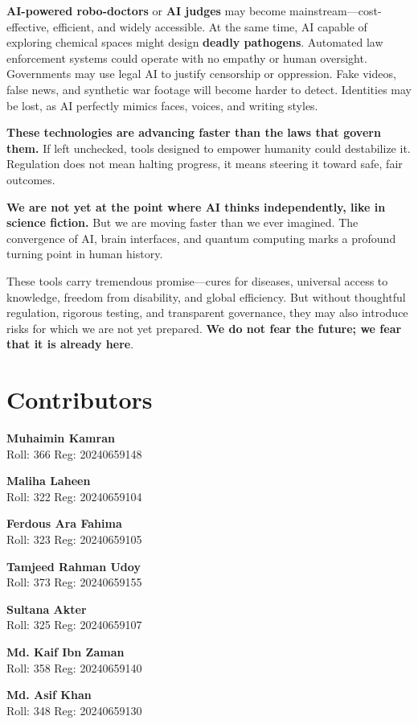 \documentclass[a4paper,10pt,twocolumn]{memoir}
\newcommand{\contributor}[4]{%
  \vspace{0.4em}
  \begin{minipage}{\textwidth}
    \textbf{\normalsize #1}\\
    {\footnotesize Roll: #2 \quad Reg: #3}\\
    {\footnotesize\color{gray}#4}
  \end{minipage}
}
\begin{document}
\textbf{AI-powered robo-doctors} or \textbf{AI judges} may become mainstream—cost-effective, efficient, and widely accessible. At the same time, AI capable of exploring chemical spaces might design \textbf{deadly pathogens}. Automated law enforcement systems could operate with no empathy or human oversight. Governments may use legal AI to justify censorship or oppression. Fake videos, false news, and synthetic war footage will become harder to detect. Identities may be lost, as AI perfectly mimics faces, voices, and writing styles.

\textbf{These technologies are advancing faster than the laws that govern them.} If left unchecked, tools designed to empower humanity could destabilize it. Regulation does not mean halting progress, it means steering it toward safe, fair outcomes.

\textbf{We are not yet at the point where AI thinks independently, like in science fiction.} But we are moving faster than we ever imagined. The convergence of AI, brain interfaces, and quantum computing marks a profound turning point in human history.

These tools carry tremendous promise—cures for diseases, universal access to knowledge, freedom from disability, and global efficiency. But without thoughtful regulation, rigorous testing, and transparent governance, they may also introduce risks for which we are not yet prepared. \textbf{We do not fear the future; we fear that it is already here}.
\clearpage


\clearpage
\section*{Contributors}
\vspace*{0.2cm}  %

\contributor{Muhaimin Kamran}{366}{20240659148}{}
\contributor{Maliha Laheen}{322}{20240659104}{}
\contributor{Ferdous Ara Fahima}{323}{20240659105}{}
\contributor{Tamjeed Rahman Udoy}{373}{20240659155}{}
\contributor{Sultana Akter}{325}{20240659107}{}
\contributor{Md. Kaif Ibn Zaman}{358}{20240659140}{}
\contributor{Md. Asif Khan}{348}{20240659130}{}
\end{document}
